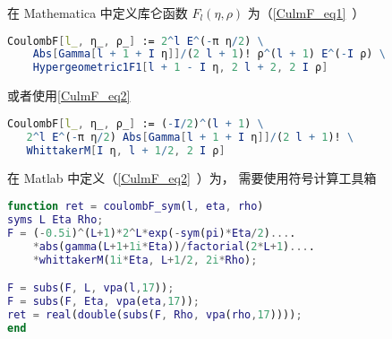 


在 Mathematica 中定义库仑函数 $F_l(\eta, \rho)$ 为（\autoref{CulmF_eq1}~） %
\begin{lstlisting}[language=Mathematica]
CoulombF[l_, η_, ρ_] := 2^l E^(-π η/2) \
    Abs[Gamma[l + 1 + I η]]/(2 l + 1)! ρ^(l + 1) E^(-I ρ) \
    Hypergeometric1F1[l + 1 - I η, 2 l + 2, 2 I ρ]
\end{lstlisting}
或者使用\autoref{CulmF_eq2}~\upref{CulmF} %
\begin{lstlisting}[language=Mathematica]
CoulombF[l_, η_, ρ_] := (-I/2)^(l + 1) \
   2^l E^(-π η/2) Abs[Gamma[l + 1 + I η]]/(2 l + 1)! \
   WhittakerM[I η, l + 1/2, 2 I ρ]
\end{lstlisting}

在 Matlab 中定义（\autoref{CulmF_eq2}~\upref{CulmF}）为， 需要使用符号计算工具箱 %
\begin{lstlisting}[language=matlab]
% rho 支持数组
function ret = coulombF_sym(l, eta, rho)
syms L Eta Rho;
F = (-0.5i)^(L+1)*2^L*exp(-sym(pi)*Eta/2)....
    *abs(gamma(L+1+1i*Eta))/factorial(2*L+1)....
    *whittakerM(1i*Eta, L+1/2, 2i*Rho);

F = subs(F, L, vpa(l,17));
F = subs(F, Eta, vpa(eta,17));
ret = real(double(subs(F, Rho, vpa(rho,17))));
end
\end{lstlisting}
